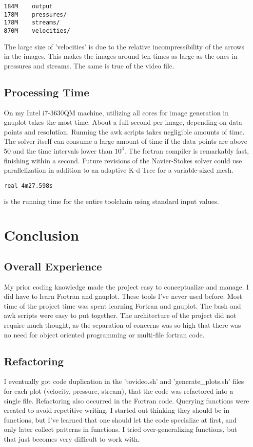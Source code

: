 \documentclass[listof=totoc]{report}
\begin{document}
\begin{verbatim}
184M	output
178M	pressures/
178M	streams/
870M	velocities/
\end{verbatim}

The large size of 'velocities' is due to the relative incompressibility of the arrows in the images. This makes the images around ten times as large as the ones in pressures and streams. The same is true of the video file.

\section{Processing Time}
On my Intel i7-3630QM machine, utilizing all cores for image generation in gnuplot takes the most time. About a full second per image, depending on data points and resolution. Running the awk scripts takes negligible amounts of time. The solver itself can consume a large amount of time if the data points are above 50 and the time intervals lower than $10^3$. The fortran compiler is remarkably fast, finishing within a second. Future revisions of the Navier-Stokes solver could use parallelization in addition to an adaptive K-d Tree for a variable-sized mesh.
\begin{verbatim}
real 4m27.598s
\end{verbatim} is the running time for the entire toolchain using standard input values.

\chapter{Conclusion}
\section{Overall Experience}
My prior coding knowledge made the project easy to conceptualize and manage. I did have to learn Fortran and gnuplot. These tools I've never used before. Most time of the project time was spent learning Fortran and gnuplot. The bash and awk scripts were easy to put together. The architecture of the project did not require much thought, as the separation of concerns was so high that there was no need for object oriented programming or multi-file fortran code.

\section{Refactoring}
I eventually got code duplication in the 'tovideo.sh' and 'generate_plots.sh' files for each plot (velocity, pressure, stream), that the code was refactored into a single file. Refactoring also occurred in the Fortran code. Querying functions were created to avoid repetitive writing. I started out thinking they should be in functions, but I've learned that one should let the code specialize at first, and only later collect patterns in functions. I tried over-generalizing functions, but that just becomes very difficult to work with.
\end{document}
